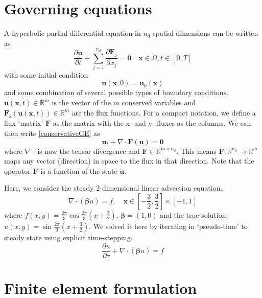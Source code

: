 \documentclass[11pt]{article}
\let\bld\boldsymbol
\begin{document}
\section{Governing equations}

A hyperbolic partial differential equation in $n_d$ spatial dimensions can be written as
\begin{equation}
\frac{\partial \bld{u}}{\partial t} + \sum_{j=1}^{n_d} \frac{\partial \bld{F}_j}{\partial x_j} = \bld{0} \quad \bld{x} \in \Omega, t \in [0,T]
\label{conservativeGE}
\end{equation}
with some initial condition
\begin{equation}
\bld{u}(\bld{x},0) = \bld{u}_0(\bld{x})
\end{equation}
and some combination of several possible types of boundary conditions.
$\bld{u}(\bld{x},t) \in \mathbb{R}^m$ is the vector of the $m$ conserved variables and $\bld{F}_j(\bld{u}(\bld{x},t)) \in \mathbb{R}^m$ are the flux functions. For a compact notation, we define a flux `matrix' $\bld{F}$ as the matrix with the x- and y- fluxes as the columns. We can then write \eqref{conservativeGE} as
\begin{equation}
\bld{u}_t + \nabla\cdot\bld{F}(\bld{u}) = \bld{0}
\label{conservativetensorGE}
\end{equation}
where $\nabla\cdot$ is now the tensor divergence and $\bld{F} \in \mathbb{R}^{m\times n_d}$. This means $\bld{F}:\mathbb{R}^{n_d}\rightarrow \mathbb{R}^m$ maps any vector (direction) in space to the flux in that direction. Note that the operator $\bld{F}$ is a function of the state $\bld{u}$.

Here, we consider the steady 2-dimensional linear advection equation.
\begin{equation}
\nabla\cdot(\bld{\beta}u) = f, \quad \bld{x} \in [-\frac32,\frac32]\times[-1,1]
\end{equation}
where $f(x,y) = \frac{2\pi}{3}\cos\frac{2\pi}{3}(x+\frac32)$, $\bld{\beta} = (1,0)$ and the true solution $u(x,y) = \sin\frac{2\pi}{3}(x+\frac32)$. We solved it here by iterating in `pseudo-time' to steady state using explicit time-stepping.
\begin{equation}
\frac{\partial u}{\partial \tau} + \nabla\cdot(\bld{\beta}u) = f
\end{equation}

\section{Finite element formulation}
\end{document}
